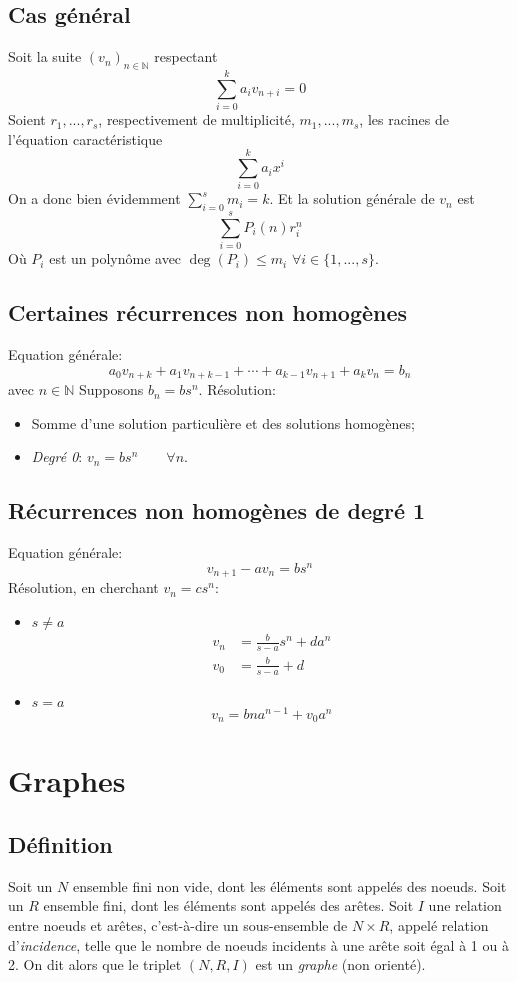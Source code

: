 \subsection{Cas général}
Soit la suite $(v_n)_{n \in \mathbb{N}}$ respectant
\[ \sum_{i = 0}^{k} a_i v_{n + i} = 0 \]
Soient $r_1, ..., r_s$, respectivement de multiplicité,
$m_1, ..., m_s$, les racines de l'équation caractéristique
\[ \sum_{i = 0}^{k} a_i x^{i} \]
On a donc bien évidemment $\sum_{i = 0}^{s} m_i = k$.
Et la solution générale de $v_n$ est
$$\sum_{i=0}^{s} P_i(n)r_{i}^{n}$$
Où $P_i$ est un polynôme avec
$\deg(P_i) \leq m_i$ $\forall i \in \{1, ..., s\}$.

\subsection{Certaines récurrences non homogènes}
Equation générale:
\[ a_0v_{n+k} + a_1v_{n+k-1} + \cdots + a_{k-1}v_{n+1} + a_kv_n = b_n \]
avec $n \in \mathbb{N}$
Supposons $b_n = bs^n$.
Résolution:
\begin{itemize}
  \item Somme d'une solution particulière et des solutions homogènes;
  \item \emph{Degré 0}: $v_n = bs^n \qquad \forall n$.
\end{itemize}

\subsection{Récurrences non homogènes de degré 1}
Equation générale:
\[ v_{n+1} - av_n = bs^n \]
Résolution, en cherchant $v_n = cs^n$:
\begin{itemize}
  \item $s \neq a$
    \begin{align*}
      v_n & = \frac{b}{s - a}s^n + da^n\\
      v_0 & = \frac{b}{s - a} + d
    \end{align*}
  \item $s = a$ \[ v_n = bna^{n-1} + v_0a^n \]
\end{itemize}


\section{Graphes}

\subsection{Définition}
Soit un $N$ ensemble fini non vide,
dont les éléments sont appelés des noeuds.
Soit un $R$ ensemble fini,
dont les éléments sont appelés des arêtes.
Soit $I$ une relation entre noeuds et arêtes,
c'est-à-dire un sous-ensemble de $N \times R$,
appelé relation d'\emph{incidence},
telle que le nombre de noeuds incidents à une arête soit égal à 1 ou à 2.
On dit alors que le triplet $(N, R, I)$ est un \emph{graphe} (non orienté).

